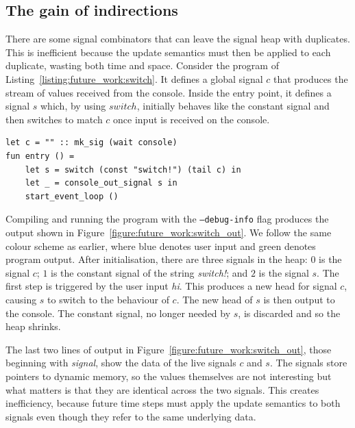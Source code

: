 \subsection{The gain of indirections}

There are some signal combinators that can leave the signal heap with duplicates. This is inefficient because the update semantics must then be applied to each duplicate, wasting both time and space.  
Consider the program of Listing~\ref{listing:future_work:switch}. 
It defines a global signal $c$ that produces the stream of values received from the console. Inside the entry point, it defines a signal $s$ which, by using $switch$, initially behaves like the constant signal and then switches to match $c$ once input is received on the console.

\begin{lstlisting}[caption={Rizzo program using the switch combinator.}, label={listing:future_work:switch}]
let c = "" :: mk_sig (wait console)
fun entry () = 
    let s = switch (const "switch!") (tail c) in
    let _ = console_out_signal s in
    start_event_loop ()
\end{lstlisting}

Compiling and running the program with the \texttt{--debug-info} flag produces the output shown in Figure~\ref{figure:future_work:switch_out}.
We follow the same colour scheme as earlier, where blue denotes user input and green denotes program output.
After initialisation, there are three signals in the heap: $0$ is the signal $c$; $1$ is the constant signal of the string \textit{switch!}; and $2$ is the signal $s$. 
The first step is triggered by the user input \textit{hi}. This produces a new head for signal $c$, causing $s$ to switch to the behaviour of $c$. The new head of $s$ is then output to the console. The constant signal, no longer needed by $s$, is discarded and so the heap shrinks.

The last two lines of output in Figure~\ref{figure:future_work:switch_out}, those beginning with \textit{signal}, show the data of the live signals $c$ and $s$.
The signals store pointers to dynamic memory, so the values themselves are not interesting but what matters is that they are identical across the two signals.
This creates inefficiency, because future time steps must apply the update semantics to both signals even though they refer to the same underlying data.

